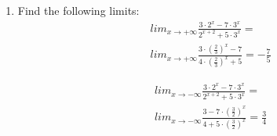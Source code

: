 \documentclass{article}
\begin{document}
\begin{enumerate}
\item Find the following limits:
\begin{align*}
&lim_{x \to +\infty} \frac{3 \cdot 2^x - 7 \cdot 3^x}{2^{x + 2} + 5 \cdot 3^x} =\\
&lim_{x \to +\infty} \frac{3 \cdot (\frac{2}{3})^x - 7}{4 \cdot (\frac{2}{3})^x + 5} = -\frac{7}{5}
\end{align*}

\begin{align*}
&lim_{x \to -\infty} \frac{3 \cdot 2^x - 7 \cdot 3^x}{2^{x + 2} + 5 \cdot 3^x} =\\
&lim_{x \to -\infty} \frac{3 - 7 \cdot (\frac{3}{2})^x}{4 + 5 \cdot (\frac{3}{2})^x} = \frac{3}{4}
\end{align*}

\end{enumerate}
\end{document}
